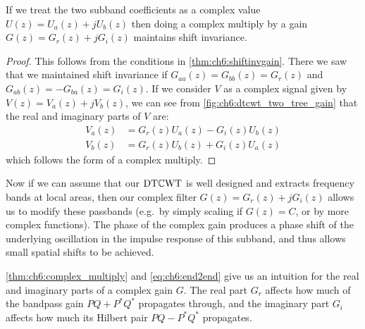 \begin{theorem}\label{thm:ch6:complex_multiply}
  If we treat the two subband coefficients as a complex value $U(z) = U_a(z) +
  jU_b(z)$ then doing a complex multiply by a gain $G(z) = G_r(z) + jG_i(z)$
  maintains shift invariance.
\end{theorem}
\begin{proof}
  This follows from the conditions in \autoref{thm:ch6:shiftinvgain}. There we
  saw that we maintained shift invariance if 
  $G_{aa}(z) = G_{bb}(z) = G_r(z)$ and $G_{ab}(z) = -G_{ba}(z) = G_i(z)$. 
  If we consider $V$ as a complex signal given by $V(z) = V_a(z) + jV_b(z)$, we
  can see from \autoref{fig:ch6:dtcwt_two_tree_gain} that the real and imaginary
  parts of $V$ are:
  \begin{align}
    V_a(z) &= G_r(z) U_a(z) - G_i(z) U_b(z) \\
    V_b(z) &= G_r(z) U_b(z) + G_i(z) U_a(z) 
  \end{align}
  which follows the form of a complex multiply.
\end{proof}

Now if we can assume that our $\mathrm{DT}\mathbb{C}\mathrm{WT}$ is well designed and extracts frequency
bands at local areas, then our complex filter $G(z)=G_r(z) + jG_i(z)$ allows us
to modify these passbands (e.g.\ by simply scaling if $G(z) = C$, or by more
complex functions). The phase of the complex gain produces a phase shift of the
underlying oscillation in the impulse response of this subband, and thus allows
small spatial shifts to be achieved.

\autoref{thm:ch6:complex_multiply} and \eqref{eq:ch6:end2end} give us an intuition for the real and
imaginary parts of a complex gain $G$. The real part $G_r$ affects how much of
the bandpass gain $PQ + P^*Q^*$ propagates through, and the imaginary part $G_i$
affects how much its Hilbert pair $PQ-P^*Q^*$ propagates.
